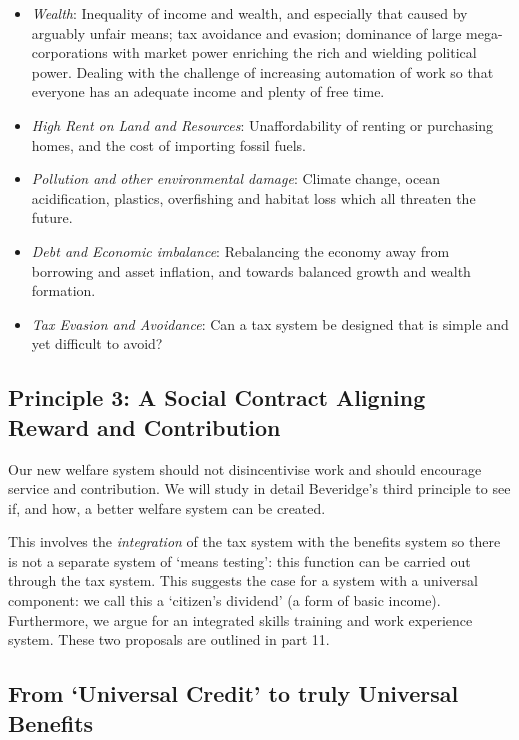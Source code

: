 \documentclass[]{tufte-handout}
\providecommand{\tightlist}{%
  \setlength{\itemsep}{0pt}\setlength{\parskip}{0pt}}
\begin{document}
\begin{itemize}
\tightlist
\item
  \emph{Wealth}: Inequality of income and wealth, and especially that
  caused by arguably unfair means; tax avoidance and evasion; dominance
  of large mega-corporations with market power enriching the rich and
  wielding political power. Dealing with the challenge of increasing
  automation of work so that everyone has an adequate income and plenty
  of free time.
\item
  \emph{High Rent on Land and Resources}: Unaffordability of renting or
  purchasing homes, and the cost of importing fossil fuels.
\item
  \emph{Pollution and other environmental damage}: Climate change, ocean
  acidification, plastics, overfishing and habitat loss which all
  threaten the future.
\item
  \emph{Debt and Economic imbalance}: Rebalancing the economy away from
  borrowing and asset inflation, and towards balanced growth and wealth
  formation.
\item
  \emph{Tax Evasion and Avoidance}: Can a tax system be designed that is
  simple and yet difficult to avoid?
\end{itemize}

\hypertarget{principle-3-a-social-contract-aligning-reward-and-contribution}{%
\subsection{\texorpdfstring{\textbf{Principle 3: A Social Contract
Aligning Reward and
Contribution}}{Principle 3: A Social Contract Aligning Reward and Contribution}}\label{principle-3-a-social-contract-aligning-reward-and-contribution}}

Our new welfare system should not disincentivise work and should
encourage service and contribution. We will study in detail Beveridge's
third principle to see if, and how, a better welfare system can be
created.

This involves the \emph{integration} of the tax system with the benefits
system so there is not a separate system of `means testing': this
function can be carried out through the tax system. This suggests the
case for a system with a universal component: we call this a `citizen's
dividend' (a form of basic income). Furthermore, we argue for an
integrated skills training and work experience system. These two
proposals are outlined in part 11.

\hypertarget{from-universal-credit-to-truly-universal-benefits}{%
\subsection{\texorpdfstring{\textbf{From `Universal Credit' to truly
Universal
Benefits}}{From `Universal Credit' to truly Universal Benefits}}\label{from-universal-credit-to-truly-universal-benefits}}
\end{document}
